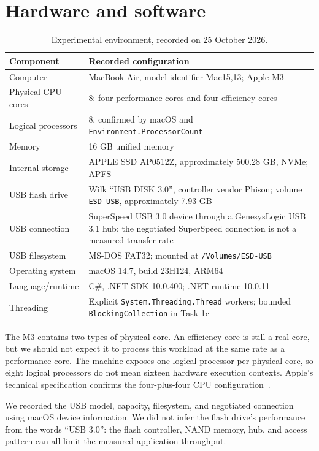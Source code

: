 \section{Hardware and software}
\begin{table}[H]\centering\small
\caption{Experimental environment, recorded on 25 October 2026.}\label{tab:hardware}
\begin{tabularx}{\textwidth}{@{}p{}X@{}}\toprule
Component & Recorded configuration\\\midrule
Computer & MacBook Air, model identifier Mac15,13; Apple M3\\
Physical CPU cores & 8: four performance cores and four efficiency cores\\
Logical processors & 8, confirmed by macOS and \texttt{Environment.ProcessorCount}\\
Memory & 16 GB unified memory\\
Internal storage & APPLE SSD AP0512Z, approximately 500.28 GB, NVMe; APFS\\
USB flash drive & Wilk ``USB DISK 3.0'', controller vendor Phison; volume \texttt{ESD-USB}, approximately 7.93 GB\\
USB connection & SuperSpeed USB 3.0 device through a GenesysLogic USB 3.1 hub; the negotiated SuperSpeed connection is not a measured transfer rate\\
USB filesystem & MS-DOS FAT32; mounted at \texttt{/Volumes/ESD-USB}\\
Operating system & macOS 14.7, build 23H124, ARM64\\
Language/runtime & C\#, .NET SDK 10.0.400; .NET runtime 10.0.11\\
Threading & Explicit \texttt{System.Threading.Thread} workers; bounded \texttt{BlockingCollection} in Task 1c\\\bottomrule
\end{tabularx}
\end{table}

The M3 contains two types of physical core. An efficiency core is still a real core, but we should not expect it to process this workload at the same rate as a performance core. The machine exposes one logical processor per physical core, so eight logical processors do not mean sixteen hardware execution contexts. Apple's technical specification confirms the four-plus-four CPU configuration~\cite{apple}.

We recorded the USB model, capacity, filesystem, and negotiated connection using macOS device information. We did not infer the flash drive's performance from the words ``USB 3.0'': the flash controller, NAND memory, hub, and access pattern can all limit the measured application throughput.
